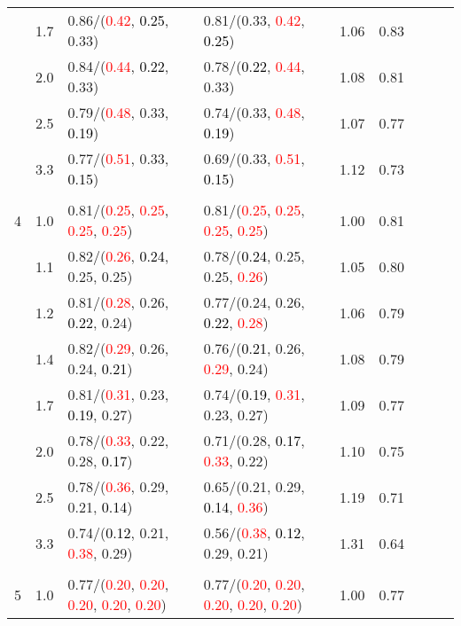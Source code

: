 \documentclass[10pt,a4paper]{report}
\begin{document}
\begin{table}[!htbp]
\begin{center}
{\begin{tabular}{ccllccccc}
			&1.7&0.86/(\textcolor{red}{0.42}, \textcolor{black}{0.25}, 0.33)&0.81/(0.33, \textcolor{red}{0.42}, \textcolor{black}{0.25})&1.06&0.83\\
			&2.0&0.84/(\textcolor{red}{0.44}, \textcolor{black}{0.22}, 0.33)&0.78/(\textcolor{black}{0.22}, \textcolor{red}{0.44}, 0.33)&1.08&0.81\\
			&2.5&0.79/(\textcolor{red}{0.48}, 0.33, \textcolor{black}{0.19})&0.74/(0.33, \textcolor{red}{0.48}, \textcolor{black}{0.19})&1.07&0.77\\
			&3.3&0.77/(\textcolor{red}{0.51}, 0.33, \textcolor{black}{0.15})&0.69/(0.33, \textcolor{red}{0.51}, \textcolor{black}{0.15})&1.12&0.73\\
			&&&&\\
			4			&1.0&0.81/(\textcolor{red}{0.25}, \textcolor{red}{0.25}, \textcolor{red}{0.25}, \textcolor{red}{0.25})&0.81/(\textcolor{red}{0.25}, \textcolor{red}{0.25}, \textcolor{red}{0.25}, \textcolor{red}{0.25})&1.00&0.81\\
			&1.1&0.82/(\textcolor{red}{0.26}, \textcolor{black}{0.24}, 0.25, 0.25)&0.78/(\textcolor{black}{0.24}, 0.25, 0.25, \textcolor{red}{0.26})&1.05&0.80\\
			&1.2&0.81/(\textcolor{red}{0.28}, 0.26, \textcolor{black}{0.22}, 0.24)&0.77/(0.24, 0.26, \textcolor{black}{0.22}, \textcolor{red}{0.28})&1.06&0.79\\
			&1.4&0.82/(\textcolor{red}{0.29}, 0.26, 0.24, \textcolor{black}{0.21})&0.76/(\textcolor{black}{0.21}, 0.26, \textcolor{red}{0.29}, 0.24)&1.08&0.79\\
			&1.7&0.81/(\textcolor{red}{0.31}, 0.23, \textcolor{black}{0.19}, 0.27)&0.74/(\textcolor{black}{0.19}, \textcolor{red}{0.31}, 0.23, 0.27)&1.09&0.77\\
			&2.0&0.78/(\textcolor{red}{0.33}, 0.22, 0.28, \textcolor{black}{0.17})&0.71/(0.28, \textcolor{black}{0.17}, \textcolor{red}{0.33}, 0.22)&1.10&0.75\\
			&2.5&0.78/(\textcolor{red}{0.36}, 0.29, 0.21, \textcolor{black}{0.14})&0.65/(0.21, 0.29, \textcolor{black}{0.14}, \textcolor{red}{0.36})&1.19&0.71\\
			&3.3&0.74/(\textcolor{black}{0.12}, 0.21, \textcolor{red}{0.38}, 0.29)&0.56/(\textcolor{red}{0.38}, \textcolor{black}{0.12}, 0.29, 0.21)&1.31&0.64\\
			&&&&\\
			5			&1.0&0.77/(\textcolor{red}{0.20}, \textcolor{red}{0.20}, \textcolor{red}{0.20}, \textcolor{red}{0.20}, \textcolor{red}{0.20})&0.77/(\textcolor{red}{0.20}, \textcolor{red}{0.20}, \textcolor{red}{0.20}, \textcolor{red}{0.20}, \textcolor{red}{0.20})&1.00&0.77\\

\end{tabular}}
\end{center}
\end{table}
\end{document}

